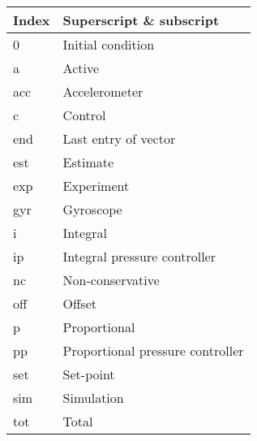 \begin{spacing}{0.9}
\begin{multicols}{2}
\begin{table}[H]
\centering
    \begin{tabular}{p{1.1cm} p{5.4cm}} \hline
    \textbf{Index}    &   \textbf{Superscript \& subscript}\\ \hline
    0     &  Initial condition \\
    a     &  Active \\
    acc    & Accelerometer \\
    c     & Control \\
    end   & Last entry of vector \\
    est   & Estimate \\
    exp    & Experiment \\
    gyr  & Gyroscope \\
    i     & Integral \\
    ip     & Integral pressure controller \\
    nc    & Non-conservative \\
    off   & Offset \\
    p    & Proportional \\
    pp    & Proportional pressure controller\\
    set   & Set-point \\
    sim   & Simulation \\
    tot    & Total \\ \hline
    \end{tabular}
\end{table}







\end{multicols}
\end{spacing}
